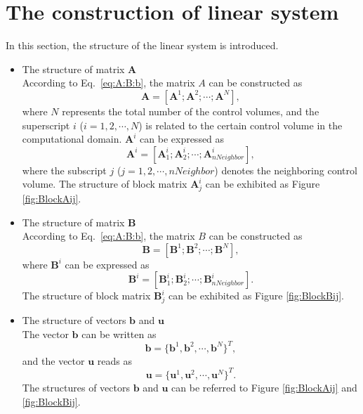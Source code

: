 \documentclass[review]{elsarticle}
\begin{document}
\section{The construction of linear system}
In this section, the structure of the linear system is introduced.
\begin{itemize}
	\item The structure of matrix $\bm{A}$\\
		According to Eq.~\eqref{eq:A:B:b}, the matrix $A$ can be constructed as 
		\begin{equation}\label{eq:A}
			\bm{A}=\left[\bm{A}^1; \bm{A}^2; \cdots; \bm{A}^N\right],
		\end{equation}
		where $N$ represents the total number of the control volumes, and the superscript $i$ ($i=1,2, \cdots, N$) is related to the 
		certain control volume in the computational domain. $\bm{A}^i$ can be expressed as
		\begin{equation}\label{eq:Ai}
			\bm{A}^i=\left[\bm{A}^i_1; \bm{A}^i_2; \cdots; \bm{A}^i_{nNeighbor}\right],
		\end{equation}
		where the subscript $j$ ($j=1,2, \cdots, nNeighbor$) denotes the neighboring control volume. The structure of block matrix $\bm{A}^i_j$ can be exhibited as Figure \ref{fig:BlockAij}.

	\item The structure of matrix $\bm{B}$\\
		According to Eq.~\eqref{eq:A:B:b}, the matrix $B$ can be constructed as 
		\begin{equation}\label{eq:B}
		\bm{B}=\left[\bm{B}^1; \bm{B}^2; \cdots; \bm{B}^N\right],
		\end{equation}
		where $\bm{B}^i$ can be expressed as
		\begin{equation}\label{eq:Bi}
		\bm{B}^i=\left[\bm{B}^i_1; \bm{B}^i_2; \cdots; \bm{B}^i_{nNeighbor}\right].
		\end{equation}
		The structure of block matrix $\bm{B}^i_j$ can be exhibited as Figure \ref{fig:BlockBij}.

	\item The structure of vectors $\bm{b}$ and $\bm{u}$\\
		The vector $\bm{b}$ can be written as
		\begin{equation}\label{eq:b}
			\bm{b}=\{\bm{b}^1, \bm{b}^2, \cdots, \bm{b}^N\}^T,
		\end{equation}
		and the vector $\bm{u}$ reads as
		\begin{equation}\label{eq:u}
			\bm{u} = \{\bm{u}^1, \bm{u}^2, \cdots, \bm{u}^N\}^T.
		\end{equation}
		The structures of vectors $\bm{b}$ and $\bm{u}$ can be referred to Figure \ref{fig:BlockAij} and \ref{fig:BlockBij}.
\end{itemize}
\end{document}
